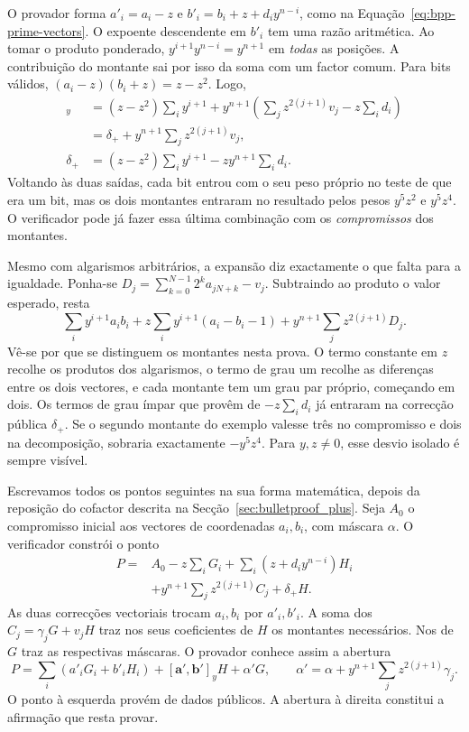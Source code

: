 O provador forma \(a'_i=a_i-z\) e
\(b'_i=b_i+z+d_i y^{n-i}\), como na
Equação~\eqref{eq:bpp-prime-vectors}. O expoente descendente em
\(b'_i\) tem uma razão aritmética. Ao tomar o produto ponderado,
\(y^{i+1}y^{n-i}=y^{n+1}\) em \emph{todas} as posições.
A contribuição do montante sai por isso da soma com um factor comum.
Para bits válidos, \((a_i-z)(b_i+z)=z-z^2\). Logo,
\begin{align*}
 [\boldsymbol a',\boldsymbol b']_y
 &= (z-z^2)\sum_i y^{i+1}
       +y^{n+1}\left(\sum_j z^{2(j+1)}v_j-z\sum_i d_i\right)\\
 &= \delta_+ + y^{n+1}\sum_j z^{2(j+1)}v_j,\\
 \delta_+&=(z-z^2)\sum_i y^{i+1}-z y^{n+1}\sum_i d_i .
\end{align*}
Voltando às duas saídas, cada bit entrou com o seu peso próprio no
teste de que era um bit, mas os dois montantes entraram no resultado
pelos pesos \(y^5 z^2\) e \(y^5 z^4\). O verificador pode já fazer
essa última combinação com os \emph{compromissos} dos montantes.

Mesmo com algarismos arbitrários, a expansão diz exactamente
o que falta para a igualdade. Ponha-se
\(D_j=\sum_{k=0}^{N-1}2^k a_{jN+k}-v_j\).
Subtraindo ao produto o valor esperado, resta
\[
 \sum_i y^{i+1}a_i b_i
 +z\sum_i y^{i+1}(a_i-b_i-1)
 +y^{n+1}\sum_j z^{2(j+1)}D_j .
\]
Vê-se por que se distinguem os montantes nesta prova. O termo
constante em \(z\) recolhe os produtos dos algarismos, o termo de
grau um recolhe as diferenças entre os dois vectores, e cada
montante tem um grau par próprio, começando em dois. Os termos de
grau ímpar que provêm de \(-z\sum_i d_i\) já entraram na correcção
pública \(\delta_+\). Se o segundo montante do exemplo valesse
três no compromisso e dois na decomposição, sobraria exactamente
\(-y^5z^4\). Para \(y,z\ne0\), esse desvio isolado é sempre visível.

Escrevamos todos os pontos seguintes na sua forma matemática, depois
da reposição do cofactor descrita na Secção~\ref{sec:bulletproof_plus}.
Seja \(A_0\) o compromisso inicial aos vectores de coordenadas
\(a_i,b_i\), com máscara \(\alpha\). O verificador constrói o ponto
\begin{align*}
 P={}&A_0-z\sum_iG_i+\sum_i(z+d_i y^{n-i})H_i\\
    &+y^{n+1}\sum_j z^{2(j+1)}C_j+\delta_+ H .
\end{align*}
As duas correcções vectoriais trocam \(a_i,b_i\) por \(a'_i,b'_i\).
A soma dos \(C_j=\gamma_jG+v_jH\) traz nos seus coeficientes de \(H\)
os montantes necessários. Nos de \(G\) traz as respectivas máscaras.
O provador conhece assim a abertura
\[
 P=\sum_i(a'_iG_i+b'_iH_i)
       +[\boldsymbol a',\boldsymbol b']_y H+\alpha'G,\qquad
 \alpha'=\alpha+y^{n+1}\sum_j z^{2(j+1)}\gamma_j.
\]
O ponto à esquerda provém de dados públicos. A abertura à direita
constitui a afirmação que resta provar.

